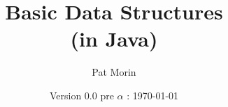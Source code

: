 \documentclass[11pt]{book}
\title{Basic Data Structures\\(in Java)}
\author{Pat Morin}
\date{Version 0.0 pre $\alpha$ : \today}
\begin{document}
\begin{titlepage}
  \maketitle
\end{titlepage}

\ \thispagestyle{empty}\newpage

\setcounter{page}{1}


\tableofcontents












\end{document}
